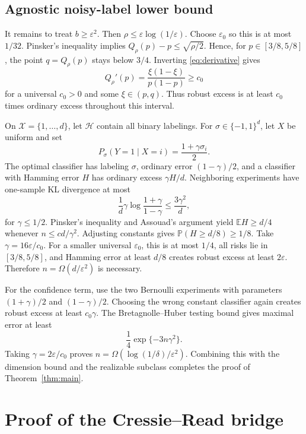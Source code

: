 \documentclass{article}
\theoremstyle{remark}
\newcommand{\E}{\mathbb E}
\newcommand{\Pp}{\mathbb P}
\newcommand{\cH}{\mathcal H}
\newcommand{\eps}{\varepsilon}
\begin{document}
\subsection{Agnostic noisy-label lower bound}

It remains to treat $b\ge\eps^2$.  Then $\rho\le\eps\log(1/\eps)$.  Choose $\eps_0$ so this is at most $1/32$. Pinsker's inequality implies $Q_\rho(p)-p\le\sqrt{\rho/2}$.  Hence, for $p\in[3/8,5/8]$, the point $q=Q_\rho(p)$ stays below $3/4$.  Inverting \eqref{eq:derivative} gives \[ Q_\rho'(p)=\frac{\xi(1-\xi)}{p(1-p)}\ge c_0
 \label{eq:Q-sensitivity}
\] for a universal $c_0>0$ and some $\xi\in(p,q)$.  Thus robust excess is at least $c_0$ times ordinary excess throughout this interval.

On $\mathcal X=\{1,\ldots,d\}$, let $\cH$ contain all binary labelings.  For $\sigma\in\{-1,1\}^d$, let $X$ be uniform and set \[ P_\sigma(Y=1\mid X=i)=\frac{1+\gamma\sigma_i}{2}. \] The optimal classifier has labeling $\sigma$, ordinary error $(1-\gamma)/2$, and a classifier with Hamming error $H$ has ordinary excess $\gamma H/d$.  Neighboring experiments have one-sample KL divergence at most \[ \frac1d\gamma\log\frac{1+\gamma}{1-\gamma} \le\frac{3\gamma^2}{d}, \] for $\gamma\le1/2$.  Pinsker's inequality and Assouad's argument yield $\E H\ge d/4$ whenever $n\le c d/\gamma^2$.  Adjusting constants gives $\Pp(H\ge d/8)\ge1/8$.  Take $\gamma=16\eps/c_0$.  For a smaller universal $\eps_0$, this is at most $1/4$, all risks lie in $[3/8,5/8]$, and Hamming error at least $d/8$ creates robust excess at least $2\eps$.  Therefore $n=\Omega(d/\eps^2)$ is necessary.

For the confidence term, use the two Bernoulli experiments with parameters $(1+\gamma)/2$ and $(1-\gamma)/2$.  Choosing the wrong constant classifier again creates robust excess at least $c_0\gamma$.  The Bretagnolle--Huber testing bound gives maximal error at least \[ \frac14\exp\{-3n\gamma^2\}. \] Taking $\gamma=2\eps/c_0$ proves $n=\Omega(\log(1/\delta)/\eps^2)$.  Combining this with the dimension bound and the realizable subclass completes the proof of Theorem~\ref{thm:main}.

\section{Proof of the Cressie--Read bridge}
\label{app:bridge}
\end{document}
